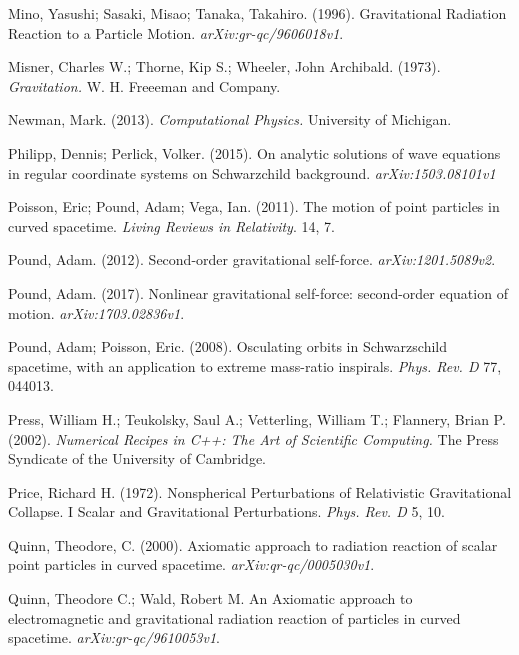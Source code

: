 Mino, Yasushi; Sasaki, Misao; Tanaka, Takahiro. (1996). Gravitational Radiation Reaction to a Particle Motion. {\em arXiv:gr-qc/9606018v1}.

Misner, Charles W.; Thorne, Kip S.; Wheeler, John Archibald. (1973). {\em Gravitation.} W. H. Freeeman and Company. 

Newman, Mark. (2013). {\em Computational Physics.} University of Michigan.

Philipp, Dennis; Perlick, Volker. (2015). On analytic solutions of wave equations in regular coordinate systems on Schwarzchild background. {\em arXiv:1503.08101v1} 

  Poisson, Eric; Pound, Adam; Vega, Ian. (2011). The motion of point particles in curved spacetime. {\em Living Reviews in Relativity}. 14, 7. 




Pound, Adam. (2012). Second-order gravitational self-force. {\em arXiv:1201.5089v2}.

Pound, Adam. (2017). Nonlinear gravitational self-force: second-order equation of motion. {\em arXiv:1703.02836v1}.

Pound, Adam; Poisson, Eric. (2008). Osculating orbits in Schwarzschild spacetime, with an application to extreme mass-ratio inspirals. {\em Phys. Rev. D} 77, 044013.


Press, William H.; Teukolsky, Saul A.; Vetterling, William T.; Flannery, Brian P. (2002). {\em Numerical Recipes in C++: The Art of Scientific Computing.} The Press Syndicate of the University of Cambridge.


Price, Richard H. (1972). Nonspherical Perturbations of Relativistic Gravitational Collapse. I Scalar and Gravitational Perturbations. {\em Phys. Rev. D} 5, 10. 

Quinn, Theodore, C. (2000). Axiomatic approach to radiation reaction of scalar point particles in curved spacetime. {\em arXiv:qr-qc/0005030v1}.

Quinn, Theodore C.; Wald, Robert M. An Axiomatic approach to electromagnetic and gravitational radiation reaction of particles in curved spacetime. {\em arXiv:gr-qc/9610053v1}.

